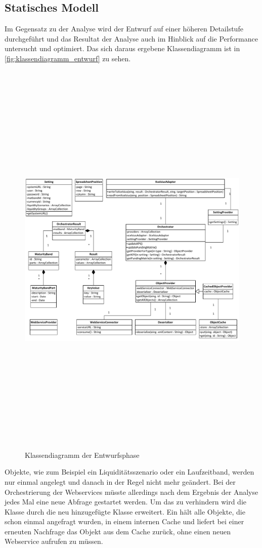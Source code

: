 \begin{onehalfspacing}
\subsection{Statisches Modell}
Im Gegensatz zu der Analyse wird der Entwurf auf einer höheren Detailstufe durchgeführt und das Resultat der Analyse auch im Hinblick auf die Performance untersucht und optimiert. Das sich daraus ergebene Klassendiagramm ist in \vref{fig:klassendiagramm_entwurf} zu sehen.


\begin{figure}[!ht]
\centering
\setlength{\unitlength}{1mm}
\includegraphics[angle=90,height=197mm]{Visio/Entwurf.pdf}
\caption{Klassendiagramm der Entwurfsphase\label{fig:klassendiagramm_entwurf}}
\end{figure}

Objekte, wie zum Beispiel ein Liquiditätsszenario oder ein Laufzeitband, werden nur einmal angelegt und danach in der Regel nicht mehr geändert. Bei der Orchestrierung der Webservices müsste allerdings nach dem Ergebnis der Analyse jedes Mal eine neue Abfrage gestartet werden. Um das zu verhindern wird die Klasse  durch die neu hinzugefügte Klasse  erweitert. Ein  hält alle Objekte, die schon einmal angefragt wurden, in einem internen Cache und liefert bei einer erneuten Nachfrage das Objekt aus dem Cache zurück, ohne einen neuen Webservice aufrufen zu müssen.


\end{onehalfspacing}

